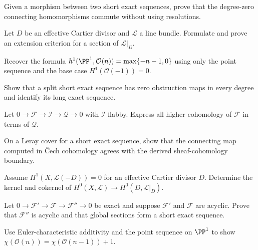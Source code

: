 \begin{problem}\label{prob:vi48-02}
Given a morphism between two short exact sequences, prove that the degree-zero connecting homomorphisms commute without using resolutions.
\end{problem}

\begin{problem}\label{prob:vi48-03}
Let $D$ be an effective Cartier divisor and $\mathcal L$ a line bundle.  Formulate and prove an extension criterion for a section of $\mathcal L|_D$.
\end{problem}

\begin{problem}\label{prob:vi48-04}
Recover the formula $h^1(\PP^1,\mathcal O(n))=\max\{-n-1,0\}$ using only the point sequence and the base case $H^1(\mathcal O(-1))=0$.
\end{problem}

\begin{problem}\label{prob:vi48-05}
Show that a split short exact sequence has zero obstruction maps in every degree and identify its long exact sequence.
\end{problem}

\begin{problem}\label{prob:vi48-06}
Let $0\to\mathcal F\to\mathcal I\to\mathcal Q\to0$ with $\mathcal I$ flabby.  Express all higher cohomology of $\mathcal F$ in terms of $\mathcal Q$.
\end{problem}

\begin{problem}\label{prob:vi48-07}
On a Leray cover for a short exact sequence, show that the connecting map computed in \v{C}ech cohomology agrees with the derived sheaf-cohomology boundary.
\end{problem}

\begin{problem}\label{prob:vi48-08}
Assume $H^1(X,\mathcal L(-D))=0$ for an effective Cartier divisor $D$.  Determine the kernel and cokernel of $H^0(X,\mathcal L)\to H^0(D,\mathcal L|_D)$.
\end{problem}

\begin{problem}\label{prob:vi48-09}
Let $0\to\mathcal F'\to\mathcal F\to\mathcal F''\to0$ be exact and suppose $\mathcal F'$ and $\mathcal F$ are acyclic.  Prove that $\mathcal F''$ is acyclic and that global sections form a short exact sequence.
\end{problem}

\begin{problem}\label{prob:vi48-10}
Use Euler-characteristic additivity and the point sequence on $\PP^1$ to show $\chi(\mathcal O(n))=\chi(\mathcal O(n-1))+1$.
\end{problem}

